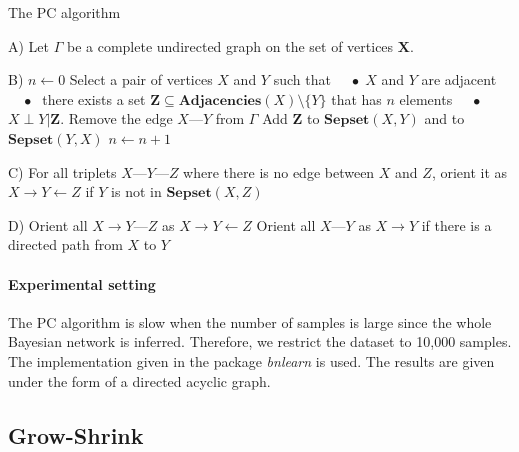 \begin{algorithm}
    \caption{The PC algorithm}
    \label{alg:pc}
    \begin{algorithmic}
        \State A) Let $\Gamma$ be a complete undirected graph on the set of
        vertices $\bm X$.

        \State B) $n\gets 0$
        \Repeat
            \Repeat
                \State Select a pair of vertices $X$ and $Y$ such that
                \State $\quad\bullet\;X$ and $Y$ are adjacent
                \State $\quad\bullet\;$ there exists a set $\bm
                Z\subseteq\textbf{Adjacencies}(X)\setminus \{Y\}$ that has $n$
                elements
                \State $\quad\bullet\;$ $X\perp Y|\bm Z$.
                \State Remove the edge $X \text{---} Y$ from $\Gamma$
                \State Add $\bm Z$ to $\textbf{Sepset}(X, Y)$ and to $\textbf{Sepset}(Y, X)$
            \State $n\gets n+1$

        \State C) For all triplets $X \text{---} Y \text{---} Z$ where there is
        no edge between $X$ and $Z$, orient it as $X\rightarrow Y \leftarrow Z$
        if $Y$ is not in $\textbf{Sepset}(X, Z)$

        \State D)
        \Repeat
            \State Orient all $X\rightarrow Y\text{---} Z$ as $X\rightarrow Y
            \leftarrow Z$
            \State Orient all $X\text{---}Y$ as $X\rightarrow Y$ if there is
            a directed path from $X$ to $Y$
    \end{algorithmic}
\end{algorithm}

\paragraph{Experimental setting} The PC algorithm is slow when the number of
samples is large since the whole Bayesian network is inferred. Therefore, we
restrict the dataset to 10,000 samples. The implementation given in the package
\emph{bnlearn} is used. The results are given under the form of a directed
acyclic graph.

\subsection{Grow-Shrink}

